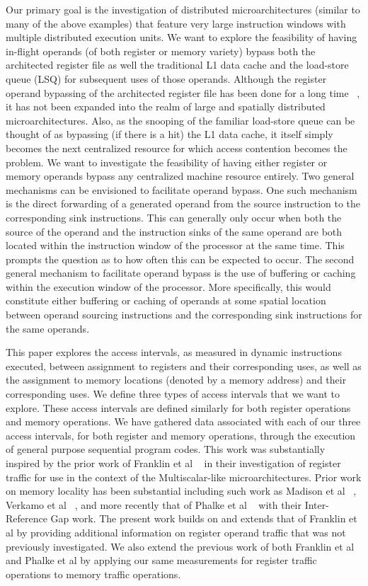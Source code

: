\documentclass[10pt,dvips]{article}
\begin{document}
Our primary goal is the investigation of distributed microarchitectures
(similar to many of the above examples) that feature very large
instruction windows with multiple distributed execution units.
We want to explore the feasibility of having in-flight operands
(of both register or memory variety) bypass both the
architected register file as well the traditional L1
data cache and the load-store queue (LSQ) for subsequent uses of
those operands.
Although the register operand bypassing of the architected register 
file has been done for a long time ~\cite{Tom67},
it has not been expanded into the realm of large and spatially distributed
microarchitectures.
Also, as the snooping of the familiar load-store queue can be
thought of as bypassing (if there is a hit) the L1 data cache, it
itself simply becomes the next centralized resource for which
access contention becomes the problem.
We want to investigate the feasibility of having 
either register or memory operands bypass any centralized
machine resource entirely.  
Two general mechanisms can be envisioned to facilitate
operand bypass.  
One such mechanism is the direct forwarding of a generated
operand from the source instruction to the corresponding sink
instructions.
This can generally only occur when
both the source of the operand and the instruction sinks of the same
operand are both located within the instruction window of the
processor at the same time.  
This prompts the question as to how
often this can be expected to occur.
The second general mechanism to facilitate operand
bypass is the use of buffering or caching within the execution
window of the processor.
More specifically, this would constitute either buffering or caching of
operands at some spatial location between operand sourcing instructions
and the corresponding sink instructions for the same operands.

This paper explores the access intervals, as measured in dynamic 
instructions executed, between assignment to
registers and their corresponding uses, as well as the
assignment to memory locations (denoted by a memory address) and their 
corresponding uses.
We define three types of access intervals that we want to explore.
These access intervals are defined similarly for both register 
operations and
memory operations.
We have gathered data associated with each of our three access
intervals, for both register and memory operations, 
through the execution of general purpose sequential
program codes.
This work was substantially inspired by the prior work 
of Franklin et al ~\cite{Franklin92}
in their investigation of register traffic
for use in the context of the Multiscalar-like microarchitectures.
Prior work on memory locality has been substantial including
such work as Madison et al ~\cite{madison76characteristics},
Verkamo et al ~\cite{verkamo85emperical}, and more recently
that of Phalke et al ~\cite{phalke95gap} with their Inter-Reference
Gap work.
The present work builds on and extends that of Franklin et al
by providing
additional information on register operand traffic that was not
previously investigated.
We also extend the previous work of both Franklin et al and 
Phalke et al by applying our same measurements for register traffic
operations to memory traffic operations.
\end{document}
